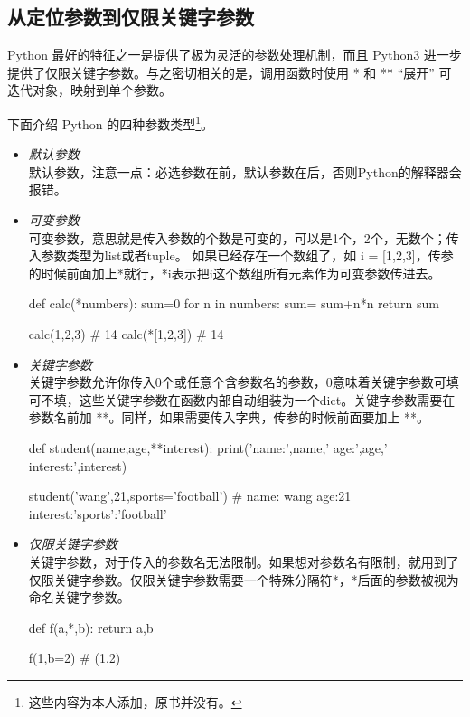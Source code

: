\subsection{从定位参数到仅限关键字参数}

Python 最好的特征之一是提供了极为灵活的参数处理机制，而且 Python3 进一步提供了仅限关键字参数。与之密切相关的是，调用函数时使用 * 和 ** ``展开'' 可迭代对象，映射到单个参数。

下面介绍 Python 的四种参数类型\footnote{这些内容为本人添加，原书并没有。}。

\begin{itemize}
    \item \textit{默认参数} \\
    默认参数，注意一点：必选参数在前，默认参数在后，否则Python的解释器会报错。
    \item \textit{可变参数} \\
    可变参数，意思就是传入参数的个数是可变的，可以是1个，2个，无数个；传入参数类型为list或者tuple。
    如果已经存在一个数组了，如 i = [1,2,3]，传参的时候前面加上*就行，*i表示把i这个数组所有元素作为可变参数传进去。
\begin{python}
def calc(*numbers):
    sum=0
    for n in numbers:
        sum= sum+n*n
    return sum

calc(1,2,3)  # 14
calc(*[1,2,3]) # 14
\end{python}
    \item \textit{关键字参数} \\
    关键字参数允许你传入0个或任意个含参数名的参数，0意味着关键字参数可填可不填，这些关键字参数在函数内部自动组装为一个dict。关键字参数需要在参数名前加 **。同样，如果需要传入字典，传参的时候前面要加上 **。

\begin{python}
def student(name,age,**interest):
    print('name:',name,' age:',age,' interest:',interest)

student('wang',21,sports='football')
# name: wang age:21 interest:{'sports':'football'}
\end{python}

    \item \textit{仅限关键字参数} \\
    关键字参数，对于传入的参数名无法限制。如果想对参数名有限制，就用到了仅限关键字参数。仅限关键字参数需要一个特殊分隔符*，*后面的参数被视为命名关键字参数。
\begin{python}
def f(a,*,b):
    return a,b

f(1,b=2)    # (1,2)
\end{python}

\end{itemize}

